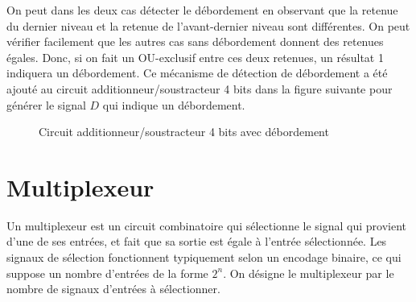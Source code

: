 \documentclass[letter, oneside]{book}
\begin{document}
\begin{enumerate}
On peut dans les deux cas détecter le débordement en observant que la
retenue du dernier niveau et la retenue de l'avant-dernier niveau sont
différentes. On peut vérifier facilement que les autres cas sans
débordement donnent des retenues égales. Donc, si on fait un
OU-exclusif entre ces deux retenues, un résultat 1 indiquera un
débordement. Ce mécanisme de détection de débordement a été ajouté au
circuit additionneur/soustracteur 4 bits dans la figure suivante pour
générer le signal \(D\) qui indique un débordement.

\begin{figure}[htbp]
\centering

\caption{\label{fig:org717601f}Circuit additionneur/soustracteur 4 bits avec débordement}
\end{figure}
\end{enumerate}


\section{Multiplexeur}
\label{sec:org56306b2}

Un multiplexeur est un circuit combinatoire qui sélectionne le signal
qui provient d'une de ses entrées, et fait que sa sortie est égale à
l'entrée sélectionnée. Les signaux de sélection fonctionnent
typiquement selon un encodage binaire, ce qui suppose un nombre
d'entrées de la forme \(2^n\). On désigne le multiplexeur par le
nombre de signaux d'entrées à sélectionner.
\end{document}
